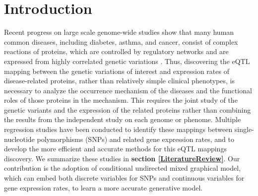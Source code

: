 \documentclass{article}
\begin{document}
 


\section{Introduction}
Recent progress on large scale genome-wide studies show that many human common diseases, including diabetes, asthma, and cancer, consist of complex reactions of proteins, which are controlled by regulatory networks and are expressed from highly correlated genetic variations \cite{basso2005reverse, chen2008variations}. Thus, discovering the eQTL mapping between the genetic variations of interest and expression rates of disease-related proteins, rather than relatively simple clinical phenotypes, is necessary to analyze the occurrence mechanism of the diseases and the functional roles of those proteins in the mechanism. This requires the joint study of the genetic variants and the expression of the related proteins rather than combining the results from the independent study on each genome or phenome. Multiple regression studies have been conducted to identify these mappings between single-nucleotide polymorphisms (SNPs) and related gene expression rates, and to develop the more efficient and accurate methods for this eQTL mappings discovery. We summarize these studies in \textbf{section \ref{LiteratureReview}}. Our contribution is the adoption of conditional undirected mixed graphical model, which can embed both discrete variables for SNPs and continuous variables for gene expression rates, to learn a more accurate generative model.
\end{document}
